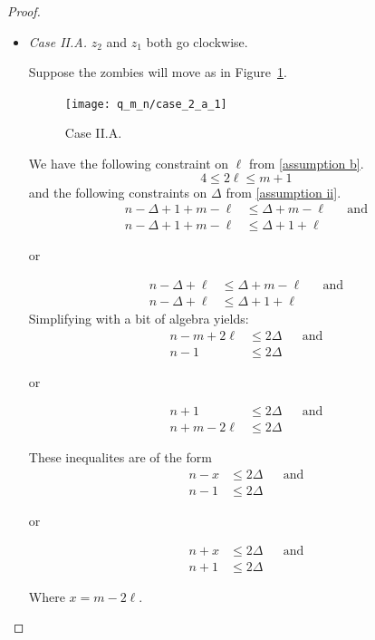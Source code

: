 \begin{proof}
\begin{proofpart}
\begin{itemize}
  \item \textit{Case II.A.} $z_2$ and $z_1$ both go clockwise.

  Suppose the zombies will move as in Figure~\ref{fig:case_2_a_1}.
  \begin{figure}
    \centering
    \texttt{[image: q\_m\_n/case\_2\_a\_1]}
    \caption{Case II.A. \label{fig:case_2_a_1}}
  \end{figure}

  We have the following constraint on $\ell$ from \ref{assumption b}.
  \[ 4 \leq 2 \ell \leq m + 1 \]
  and the following constraints on $\Delta$ from \ref{assumption ii}.
  \begin{align*}
   n - \Delta + 1 + m - \ell &\leq \Delta + m - \ell && \text{and} \\
   n - \Delta + 1 + m - \ell &\leq \Delta + 1 + \ell
  \end{align*}
  \begin{center}or\end{center}
    \begin{align*}
     n - \Delta + \ell &\leq \Delta + m - \ell && \text{and} \\
     n - \Delta + \ell &\leq \Delta + 1 + \ell
    \end{align*}
  Simplifying with a bit of algebra yields:
  \begin{align*}
   n-m +2\ell &\leq 2 \Delta && \text{and} \\
   n-1 &\leq 2\Delta
  \end{align*}
  \begin{center}or\end{center}
  \begin{align*}
   n + 1 &\leq 2 \Delta && \text{and} \\
   n + m - 2\ell &\leq 2 \Delta
  \end{align*}

  These inequalites are of the form
  \begin{align*}
   n-x &\leq 2 \Delta && \text{and} \\
   n-1 &\leq 2\Delta
  \end{align*}
  \begin{center}or\end{center}
  \begin{align*}
   n + x &\leq 2 \Delta && \text{and} \\
   n + 1 &\leq 2 \Delta
  \end{align*}

  Where $x = m -2\ell$.


\end{itemize}
\end{proofpart}
\end{proof}
